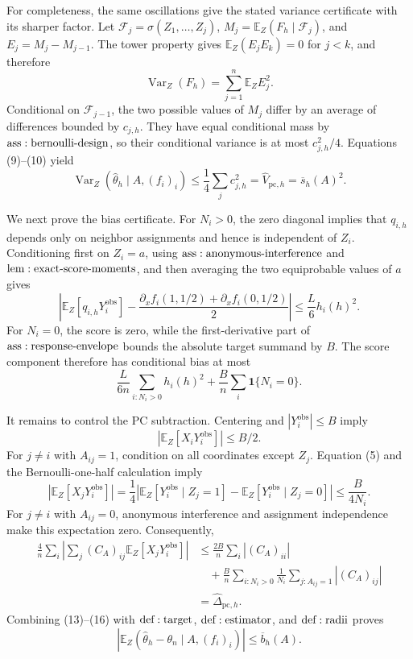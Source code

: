 For completeness, the same oscillations give the stated variance certificate with its sharper factor.  Let \(\mathcal F_j=\sigma(Z_1,\ldots,Z_j)\), \(M_j=\mathbb E_Z(F_h\mid\mathcal F_j)\), and \(E_j=M_j-M_{j-1}\).  The tower property gives \(\mathbb E_Z(E_jE_k)=0\) for \(j<k\), and therefore
\[
 \operatorname{Var}_Z(F_h)=\sum_{j=1}^n\mathbb E_ZE_j^2.
\tag{10}
\]
Conditional on \(\mathcal F_{j-1}\), the two possible values of \(M_j\) differ by an average of differences bounded by \(c_{j,h}\).  They have equal conditional mass by \({\rm ass:bernoulli\text{-}design}\), so their conditional variance is at most \(c_{j,h}^2/4\).  Equations (9)--(10) yield
\[
 \operatorname{Var}_Z(\widehat\theta_h\mid A,(f_i)_i)
 \leq\frac14\sum_jc_{j,h}^2
 =\widehat V_{\mathrm{pc},h}=\overline s_h(A)^2.
\tag{11}
\]

We next prove the bias certificate.  For \(N_i>0\), the zero diagonal implies that \(q_{i,h}\) depends only on neighbor assignments and hence is independent of \(Z_i\).  Conditioning first on \(Z_i=a\), using \({\rm ass:anonymous\text{-}interference}\) and \({\rm lem:exact\text{-}score\text{-}moments}\), and then averaging the two equiprobable values of \(a\) gives
\[
 \left|\mathbb E_Z[q_{i,h}Y_i^{\mathrm{obs}}]
 -\frac{\partial_xf_i(1,1/2)+\partial_xf_i(0,1/2)}2\right|
 \leq\frac L6h_i(h)^2.
\tag{12}
\]
For \(N_i=0\), the score is zero, while the first-derivative part of \({\rm ass:response\text{-}envelope}\) bounds the absolute target summand by \(B\).  The score component therefore has conditional bias at most
\[
 \frac{L}{6n}\sum_{i:N_i>0}h_i(h)^2
 +\frac Bn\sum_i\mathbf1\{N_i=0\}.
\tag{13}
\]

It remains to control the PC subtraction.  Centering and \(|Y_i^{\mathrm{obs}}|\leq B\) imply
\[
 |\mathbb E_Z[X_iY_i^{\mathrm{obs}}]|\leq B/2.
\tag{14}
\]
For \(j\ne i\) with \(A_{ij}=1\), condition on all coordinates except \(Z_j\).  Equation (5) and the Bernoulli-one-half calculation imply
\[
 |\mathbb E_Z[X_jY_i^{\mathrm{obs}}]|
 =\frac14\left|\mathbb E_Z[Y_i^{\mathrm{obs}}\mid Z_j=1]
 -\mathbb E_Z[Y_i^{\mathrm{obs}}\mid Z_j=0]\right|
 \leq\frac B{4N_i}.
\tag{15}
\]
For \(j\ne i\) with \(A_{ij}=0\), anonymous interference and assignment independence make this expectation zero.  Consequently,
\[
\begin{aligned}
 \frac4n\sum_i\left|\sum_j(C_A)_{ij}\mathbb E_Z[X_jY_i^{\mathrm{obs}}]\right|
 &\leq\frac{2B}{n}\sum_i|(C_A)_{ii}|\\
 &\quad+\frac Bn\sum_{i:N_i>0}\frac1{N_i}
       \sum_{j:A_{ij}=1}|(C_A)_{ij}|\\
 &=\widehat\Delta_{\mathrm{pc},h}.
\end{aligned}
\tag{16}
\]
Combining (13)--(16) with \({\rm def:target}\), \({\rm def:estimator}\), and \({\rm def:radii}\) proves
\[
 \left|\mathbb E_Z(\widehat\theta_h-\theta_n\mid A,(f_i)_i)\right|
 \leq\overline b_h(A).
\tag{17}
\]

